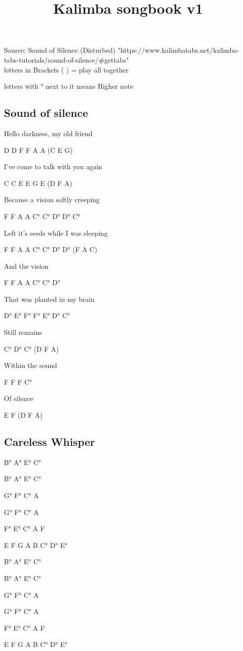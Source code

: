 \documentclass{memoir}
\title{Kalimba songbook v1}
\newenvironment{song}[1]
{ 
\subsection{#1}   
\noindent \huge \ttfamily \par
}
{  \clearpage
}
\begin{document}
Source: Sound of Silence (Disturbed)
"https://www.kalimbatabs.net/kalimba-tabs-tutorials/sound-of-silence/\#gettabs" \\
letters in Brackets (     ) = play all together 

letters with °  next to it means Higher note

\begin{song}{Sound of silence}
Hello darkness, my old friend 

D  D  F  F  A  A    (C E G)

I’ve come to talk with you again

C  C  E  E  G E   (D F A)

Because a vision softly creeping

F  F  A  A  C°  C°   D°  D°  C°

Left it’s seeds while I was sleeping

F  F  A  A  C°  C°   D°  D°   (F A C)

And the vision 

F  F  A  A  C°  C°   D°

That was planted in my brain

D°  E°  F°  F°  E°  D°  C°

Still remains

C°  D°  C°  (D F A)

Within the sound

F  F  F  C°     

Of silence

E  F   (D F A)

\end{song}

\begin{song}{Careless Whisper}
B° A° E° C°

B° A° E° C°

G° F° C° A

G° F° C° A

F° E° C° A F

E F G A B C° D° E°



B° A° E° C°

B° A° E° C°

G° F° C° A





G° F° C° A

F° E° C° A F

E F G A B C° D° E°


\end{song}
\end{document}
